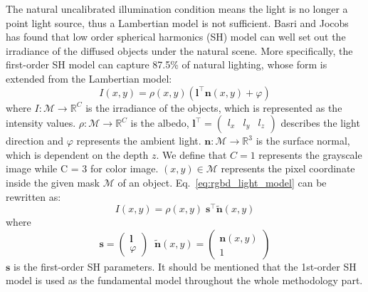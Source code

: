 The natural uncalibrated illumination condition means the light is no longer a point light source, thus a Lambertian model is not sufficient. 
Basri and Jocobs~\cite{basri2003lambertian} has found that low order spherical harmonics (SH) model can well set out the irradiance of the diffused objects under the natural scene.
More specifically, the first-order SH model can capture 87.5\% of natural lighting, whose form is extended from the Lambertian model:
\begin{equation}\label{eq:rgbd_light_model}
I(x,y) = \rho(x,y)(\mathbf{l}^\top \mathbf{n}(x,y) + \varphi)
\end{equation}
where $I : \mathcal{M}\rightarrow \mathbb{R}^C$ is the irradiance of the objects, which is represented as the intensity values. 
$\rho : \mathcal{M}\rightarrow \mathbb{R}^C$ is the albedo, $\mathbf{l}^\top = \begin{pmatrix} l_x & l_y & l_z \end{pmatrix}$ describes the light direction and $\varphi$ represents the ambient light.
$\mathbf{n} : \mathcal{M}\rightarrow \mathbb{R}^3$ is the surface normal, which is dependent on the depth $z$.
We define that $C = 1$ represents the grayscale image while C = 3 for color image. 
$(x,y) \in \mathcal{M}$ represents the pixel coordinate inside the given mask $\mathcal{M}$ of an object.
Eq.~\ref{eq:rgbd_light_model} can be rewritten as:
\begin{equation}\label{eq:rgbd_light_model2}
I(x,y) = \rho(x,y) \; \mathbf{s}^\top \tilde{\mathbf{n}}(x,y)
\end{equation}
where
\begin{equation}
\mathbf{s} = \begin{pmatrix}\mathbf{l} \\ \varphi \end{pmatrix} 
 \; \; 
\tilde{\mathbf{n}}(x,y) = \begin{pmatrix}\mathbf{n}(x,y) \\ 1\end{pmatrix}
\end{equation}
$\mathbf{s}$ is the first-order SH parameters. It should be mentioned that the 1st-order SH model is used as the fundamental model throughout the whole methodology part.

